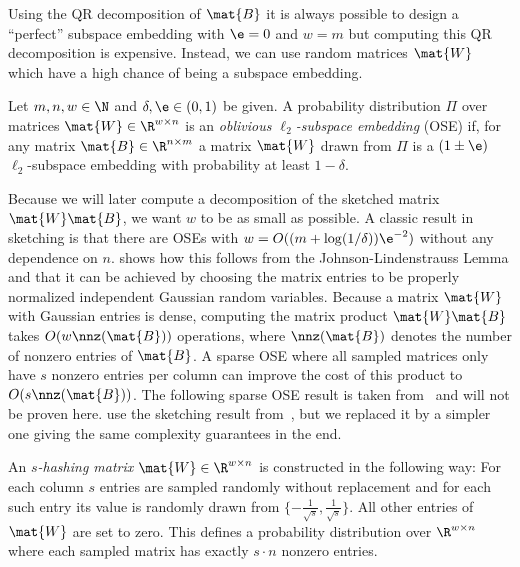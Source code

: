 Using the QR decomposition of \(\mat{B}\) it is always possible to design a \enquote{perfect} subspace embedding with \(\e = 0\) and \(w = m\)
but computing this QR decomposition is expensive.
Instead, we can use random matrices \(\mat{W}\) which have a high chance of being a subspace embedding.

\begin{definition}\label{def:oblivious-subspace-embedding}
Let \(m, n, w \in \N\) and \(\delta, \e \in (0, 1)\) be given.
A probability distribution \(\Pi\) over matrices \(\mat{W} \in \R^{w \times n}\) is an \emph{oblivious \(\ell_2\)-subspace embedding} (OSE) if, for any matrix \(\mat{B} \in \R^{n \times m}\) a matrix \(\mat{W}\) drawn from \(\Pi\) is a \((1\pm\e)\) \(\ell_2\)-subspace embedding with probability at least \(1 - \delta\).
\end{definition}

Because we will later compute a decomposition of the sketched matrix \(\mat{W}\mat{B}\), we want \(w\) to be as small as possible.
A classic result in sketching is that there are OSEs with \(w = O((m + \log(1/\delta))\e^{-2})\) without any dependence on \(n\).
\Textcite[Theorem 6]{Woodruff-Sketching} shows how this follows from the Johnson-Lindenstrauss Lemma and that it can be achieved by choosing the matrix entries to be properly normalized independent Gaussian random variables.
Because a matrix \(\mat{W}\) with Gaussian entries is dense, computing the matrix product \(\mat{W}\mat{B}\) takes \(O(w \nnz(\mat{B}))\) operations, where \(\nnz(\mat{B})\) denotes the number of nonzero entries of \(\mat{B}\).
A sparse OSE where all sampled matrices only have \(s\) nonzero entries per column can improve the cost of this product to \(O(s \nnz(\mat{B}))\).
The following sparse OSE result is taken from~\cite{Cohen-NearlyTightObliviousSubspaceEmbeddings} and will not be proven here.
\Textcite{Avron-FasterRandomizedInfeasibleIPMs} use the sketching result from~\cite{Cohen-OptimalApproximateMatrixProduct}, but we replaced it by a simpler one giving the same complexity guarantees in the end.

\begin{definition}\label{def:s-hashing-matrix}
An \emph{\(s\)-hashing matrix} \(\mat{W} \in \R^{w \times n}\) is constructed in the following way:
For each column \(s\) entries are sampled randomly without replacement and for each such entry its value is randomly drawn from \(\{ - \frac{1}{\sqrt{s}}, \frac{1}{\sqrt{s}} \}\).
All other entries of \(\mat{W}\) are set to zero.
This defines a probability distribution over \(\R^{w \times n}\) where each sampled matrix has exactly \(s \cdot n\) nonzero entries.
\end{definition}

